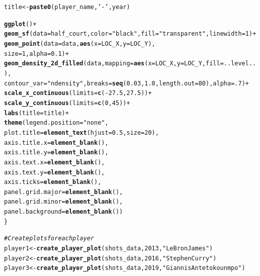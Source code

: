\documentclass{article}\usepackage[]{graphicx}\usepackage[]{xcolor}
\makeatletter
\newcommand{\hlnum}[1]{\textcolor[rgb]{0.686,0.059,0.569}{#1}}%
\newcommand{\hlstr}[1]{\textcolor[rgb]{0.192,0.494,0.8}{#1}}%
\newcommand{\hlcom}[1]{\textcolor[rgb]{0.678,0.584,0.686}{\textit{#1}}}%
\newcommand{\hlopt}[1]{\textcolor[rgb]{0,0,0}{#1}}%
\newcommand{\hlstd}[1]{\textcolor[rgb]{0.345,0.345,0.345}{#1}}%
\newcommand{\hlkwb}[1]{\textcolor[rgb]{0.69,0.353,0.396}{#1}}%
\newcommand{\hlkwc}[1]{\textcolor[rgb]{0.333,0.667,0.333}{#1}}%
\newcommand{\hlkwd}[1]{\textcolor[rgb]{0.737,0.353,0.396}{\textbf{#1}}}%
\newenvironment{kframe}{%
 \def\at@end@of@kframe{}%
 \ifinner\ifhmode%
  \def\at@end@of@kframe{\end{minipage}}%
  \begin{minipage}{\columnwidth}%
 \fi\fi%
 \def\FrameCommand##1{\hskip\@totalleftmargin \hskip-\fboxsep
 \colorbox{shadecolor}{##1}\hskip-\fboxsep
     \hskip-\linewidth \hskip-\@totalleftmargin \hskip\columnwidth}%
 \MakeFramed {\advance\hsize-\width
   \@totalleftmargin\z@ \linewidth\hsize
   \@setminipage}}%
 {\par\unskip\endMakeFramed%
 \at@end@of@kframe}
\newenvironment{knitrout}{}{} %
\makeatother
\begin{document}
\begin{knitrout}
\begin{kframe}
\begin{alltt}
  \hlstd{title} \hlkwb{<-} \hlkwd{paste0}\hlstd{(player_name,} \hlstr{' - '}\hlstd{, year)}

  \hlkwd{ggplot}\hlstd{()} \hlopt{+}
    \hlkwd{geom_sf}\hlstd{(}\hlkwc{data} \hlstd{= half_court,} \hlkwc{color} \hlstd{=} \hlstr{"black"}\hlstd{,} \hlkwc{fill} \hlstd{=} \hlstr{"transparent"}\hlstd{,} \hlkwc{linewidth} \hlstd{=} \hlnum{1}\hlstd{)} \hlopt{+}
    \hlkwd{geom_point}\hlstd{(}\hlkwc{data} \hlstd{= data,} \hlkwd{aes}\hlstd{(}\hlkwc{x} \hlstd{= LOC_X,} \hlkwc{y} \hlstd{= LOC_Y),}
               \hlkwc{size} \hlstd{=} \hlnum{1}\hlstd{,} \hlkwc{alpha} \hlstd{=} \hlnum{0.1}\hlstd{)} \hlopt{+}
    \hlkwd{geom_density_2d_filled}\hlstd{(data,} \hlkwc{mapping} \hlstd{=} \hlkwd{aes}\hlstd{(}\hlkwc{x} \hlstd{= LOC_X,} \hlkwc{y} \hlstd{= LOC_Y,} \hlkwc{fill} \hlstd{= ..level..),}
                           \hlkwc{contour_var} \hlstd{=} \hlstr{"ndensity"}\hlstd{,} \hlkwc{breaks} \hlstd{=} \hlkwd{seq}\hlstd{(}\hlnum{0.03}\hlstd{,} \hlnum{1.0}\hlstd{,} \hlkwc{length.out} \hlstd{=} \hlnum{80}\hlstd{),} \hlkwc{alpha} \hlstd{=} \hlnum{.7}\hlstd{)} \hlopt{+}
    \hlkwd{scale_x_continuous}\hlstd{(}\hlkwc{limits} \hlstd{=} \hlkwd{c}\hlstd{(}\hlopt{-}\hlnum{27.5}\hlstd{,} \hlnum{27.5}\hlstd{))} \hlopt{+}
    \hlkwd{scale_y_continuous}\hlstd{(}\hlkwc{limits} \hlstd{=} \hlkwd{c}\hlstd{(}\hlnum{0}\hlstd{,} \hlnum{45}\hlstd{))} \hlopt{+}
    \hlkwd{labs}\hlstd{(}\hlkwc{title} \hlstd{= title)} \hlopt{+}
    \hlkwd{theme}\hlstd{(}\hlkwc{legend.position} \hlstd{=} \hlstr{"none"}\hlstd{,}
          \hlkwc{plot.title} \hlstd{=} \hlkwd{element_text}\hlstd{(}\hlkwc{hjust} \hlstd{=} \hlnum{0.5}\hlstd{,} \hlkwc{size} \hlstd{=} \hlnum{20}\hlstd{),}
          \hlkwc{axis.title.x} \hlstd{=} \hlkwd{element_blank}\hlstd{(),}
          \hlkwc{axis.title.y} \hlstd{=} \hlkwd{element_blank}\hlstd{(),}
          \hlkwc{axis.text.x} \hlstd{=} \hlkwd{element_blank}\hlstd{(),}
          \hlkwc{axis.text.y} \hlstd{=} \hlkwd{element_blank}\hlstd{(),}
          \hlkwc{axis.ticks} \hlstd{=} \hlkwd{element_blank}\hlstd{(),}
          \hlkwc{panel.grid.major} \hlstd{=} \hlkwd{element_blank}\hlstd{(),}
          \hlkwc{panel.grid.minor} \hlstd{=} \hlkwd{element_blank}\hlstd{(),}
          \hlkwc{panel.background} \hlstd{=} \hlkwd{element_blank}\hlstd{())}
\hlstd{\}}

\hlcom{# Create plots for each player}
\hlstd{player1} \hlkwb{<-} \hlkwd{create_player_plot}\hlstd{(shots_data,} \hlnum{2013}\hlstd{,} \hlstr{"LeBron James"}\hlstd{)}
\hlstd{player2} \hlkwb{<-} \hlkwd{create_player_plot}\hlstd{(shots_data,} \hlnum{2016}\hlstd{,} \hlstr{"Stephen Curry"}\hlstd{)}
\hlstd{player3} \hlkwb{<-} \hlkwd{create_player_plot}\hlstd{(shots_data,} \hlnum{2019}\hlstd{,} \hlstr{"Giannis Antetokounmpo"}\hlstd{)}


\end{alltt}
\end{kframe}
\end{knitrout}
\end{document}
